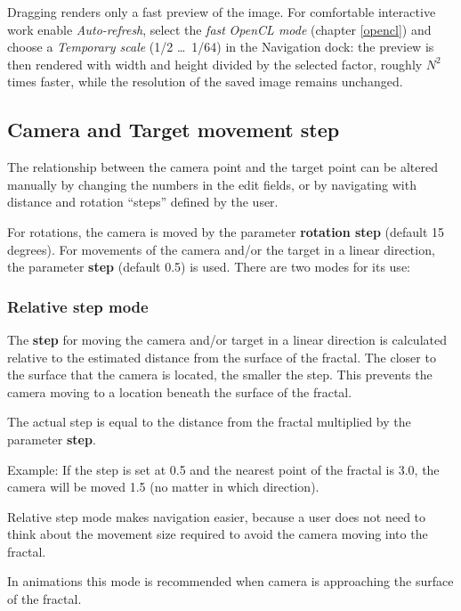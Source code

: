 Dragging renders only a fast preview of the image. For comfortable interactive work enable \emph{Auto-refresh}, select the \emph{fast} \emph{OpenCL mode} (chapter \ref{opencl}) and choose a \emph{Temporary scale} (1/2 \ldots\ 1/64) in the Navigation dock: the preview is then rendered with width and height divided by the selected factor, roughly $N^2$ times faster, while the resolution of the saved image remains unchanged.

\subsection{Camera and Target movement step}\label{camera-and-target-movement-step}

The relationship between the camera point and the target point can be altered
manually by changing the numbers in the edit fields, or by navigating with
distance and rotation ``steps'' defined by the user.

For rotations, the camera is moved by the parameter \textbf{rotation step}
(default 15 degrees). For movements of the camera and/or the target in a linear
direction, the parameter \textbf{step} (default 0.5) is used. There are two
modes for its use:

\subsubsection{Relative step mode}\label{relative-step-mode}

The \textbf{step} for moving the camera and/or target in a linear direction is
calculated relative to the estimated distance from the surface of the fractal.
The closer to the surface that the camera is located, the smaller the step. This
prevents the camera moving to a location beneath the surface of the fractal.

The actual step is equal to the distance from the fractal multiplied by the
parameter \textbf{step}.

Example: If the step is set at 0.5 and the nearest point of the
fractal is 3.0, the camera will be moved 1.5 (no matter in which direction).

Relative step mode makes navigation easier, because a user does not need to think about the movement size required to avoid
the camera moving into the fractal.

In animations this mode is recommended when camera is approaching the surface of
the fractal.

